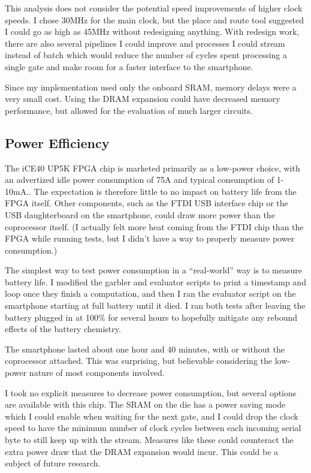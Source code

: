 This analysis does not consider the potential speed improvements of higher clock speeds. I chose 30MHz for the main clock, but the place and route tool suggested I could go as high as 45MHz without redesigning anything. With redesign work, there are also several pipelines I could improve and processes I could stream instead of batch which would reduce the number of cycles spent processing a single gate and make room for a faster interface to the smartphone.

Since my implementation used only the onboard SRAM, memory delays were a very small cost. Using the DRAM expansion could have decreased memory performance, but allowed for the evaluation of much larger circuits. 


\subsection{Power Efficiency}
The iCE40 UP5K FPGA chip is marketed primarily as a low-power choice, with an advertized idle power consumption of 75\textmu{}A and typical consumption of 1-10mA.\cite{LatticePage}. The expectation is therefore little to no impact on battery life from the FPGA itself. Other components, such as the FTDI USB interface chip or the USB daughterboard on the smartphone, could draw more power than the coprocessor itself. (I actually felt more heat coming from the FTDI chip than the FPGA while running tests, but I didn't have a way to properly measure power consumption.)

The simplest way to test power consumption in a ``real-world'' way is to measure battery life. I modified the garbler and evaluator scripts to print a timestamp and loop once they finish a computation, and then I ran the evaluator script on the smartphone starting at full battery until it died. I ran both tests after leaving the battery plugged in at 100\% for several hours to hopefully mitigate any rebound effects of the battery chemistry.

The smartphone lasted about one hour and 40 minutes, with or without the coprocessor attached. This was surprising, but believable considering the low-power nature of most components involved.

I took no explicit measures to decrease power consumption, but several options are available with this chip. The SRAM on the die has a power saving mode which I could enable when waiting for the next gate, and I could drop the clock speed to have the minimum number of clock cycles between each incoming serial byte to still keep up with the stream. Measures like these could counteract the extra power draw that the DRAM expansion would incur. This could be a subject of future research.
